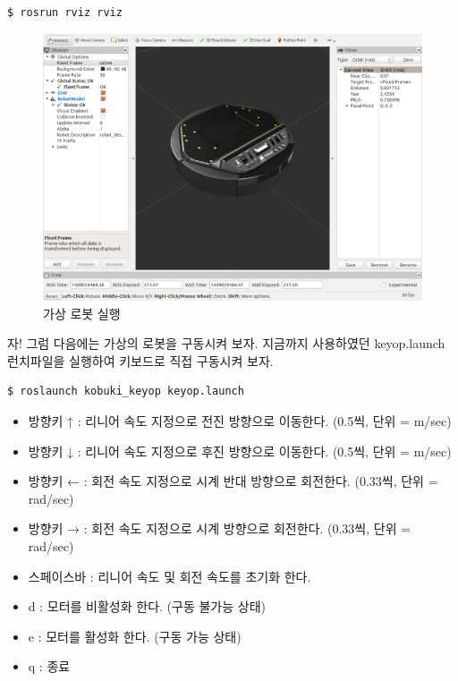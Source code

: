 \vspace{\baselineskip}
\begin{lstlisting}[language=ROS]
$ rosrun rviz rviz
\end{lstlisting}

\begin{figure}[h]
\centering\includegraphics[width=0.9\columnwidth]{pictures/chapter10/rviz_kobuki.png}
\caption{가상 로봇 실행}
\end{figure}

자! 그럼 다음에는 가상의 로봇을 구동시켜 보자. 지금까지 사용하였던 keyop.launch 런치파일을 실행하여 키보드로 직접 구동시켜 보자. 

\vspace{\baselineskip}
\begin{lstlisting}[language=ROS]
$ roslaunch kobuki_keyop keyop.launch
\end{lstlisting}

\begin{itemize}[leftmargin=*]
\item 방향키 ↑ : 리니어 속도 지정으로 전진 방향으로 이동한다. (0.5씩, 단위 = m/sec) 
\item 방향키 ↓ : 리니어 속도 지정으로 후진 방향으로 이동한다. (0.5씩, 단위 = m/sec) 
\item 방향키 ← : 회전 속도 지정으로 시계 반대 방향으로 회전한다. (0.33씩, 단위 = rad/sec) 
\item 방향키 → : 회전 속도 지정으로 시계 방향으로 회전한다. (0.33씩, 단위 = rad/sec) 
\item 스페이스바 : 리니어 속도 및 회전 속도를 초기화 한다.
\item d : 모터를 비활성화 한다. (구동 불가능 상태)
\item e : 모터를 활성화 한다. (구동 가능 상태)
\item q : 종료
\end{itemize}

